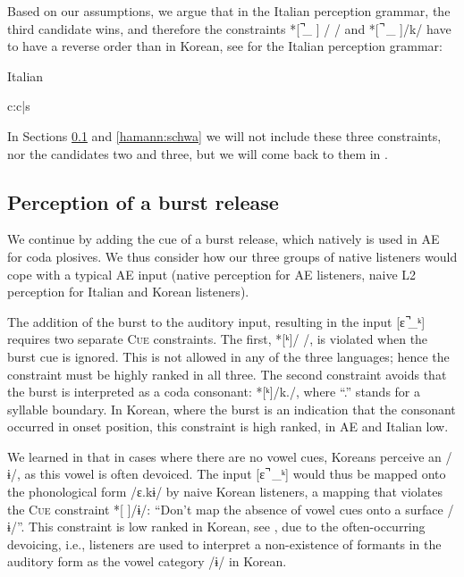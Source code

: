 \documentclass[output=paper,colorlinks,citecolor=brown]{langscibook}
\begin{document}
Based on our assumptions, we argue that in the Italian perception grammar, the third candidate wins, and therefore the constraints *[ ̚\_ ] / / and *[ ̚ \_ ]/k/ have to have a reverse order than in Korean, see  for the Italian perception grammar:


\begin{table}
\caption{Italian}
\label{hamann:tabi1}
\ShadingOff
\begin{tableau}{c:c|s}
\inp{[ɛ˺\_]}              \const*{*[˺\_]/ /}
           \vio{}              \vio{*!}            \vio{}
           \vio{*!}            \vio{}              \vio{}
  \vio{}              \vio{}              \vio{*}
\end{tableau}
\end{table}


In Sections \ref{hamann:burst} and \ref{hamann:schwa} we will not include these three constraints, nor the candidates two and three, but we will come back to them in .

\subsection{Perception of a burst release}\label{hamann:burst}

We continue by adding the cue of a burst release, which natively is used in AE for coda plosives. We thus consider how our three groups of native listeners would cope with a typical AE input (native perception for AE listeners, naive L2 perception for Italian and Korean listeners).

The addition of the burst to the auditory input, resulting in the input \mbox{[ɛ  ̚\_ᵏ]} requires two separate C\textsc{ue} constraints. The first, *[ᵏ]/ /, is violated when the burst cue is ignored. This is not allowed in any of the three languages; hence the constraint must be highly ranked in all three. The second constraint avoids that the burst is interpreted as a coda consonant:  *[ᵏ]/k./, where “.” stands for a syllable boundary. In Korean, where the burst is an indication that the consonant occurred in onset position, this constraint is high ranked, in AE and Italian low.

We learned in  that in cases where there are no vowel cues, Koreans perceive an /ɨ/, as this vowel is often devoiced. The input [ɛ ̚ \_ᵏ] would thus be mapped onto the phonological form /ɛ.kɨ/ by naive Korean listeners, a mapping that violates the C\textsc{ue} constraint *[ ]/ɨ/: “Don’t map the absence of vowel cues onto a surface /ɨ/”. This constraint is low ranked in Korean, see , due to the often-occurring devoicing, i.e., listeners are used to interpret a non-existence of formants in the auditory form as the vowel category /ɨ/ in Korean.
\end{document}
